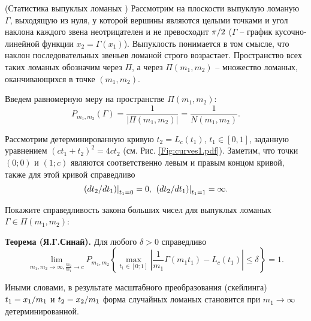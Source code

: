 \begin{problem}\DStar(Статистика выпуклых ломаных \cite{7})
\label{convcurve}
Рассмотрим на плоскости выпуклую ломаную $\Gamma $, выходящую из нуля, у которой вершины являются целыми точками и угол наклона каждого звена неотрицателен и не превосходит ${\pi \mathord{\left/ {\vphantom {\pi  2}} \right. \kern-\nulldelimiterspace} 2} $ ($\Gamma $ -- график кусочно-линейной функции $x_2 = \Gamma(x_1)$). Выпуклость понимается в том смысле, что наклон последовательных звеньев ломаной строго возрастает. Пространство всех таких ломаных обозначим через $\Pi $, а через $\Pi (m_{1} ,m_{2} )$ -- множество ломаных, оканчивающихся в точке $(m_{1} ,m_{2} )$. 

Введем равномерную меру на пространстве $\Pi (m_{1} ,m_{2} )$:
\[P_{m_{1} ,m_{2} } (\Gamma )=\frac{1}{\left|\Pi (m_{1} ,m_{2} )\right|} =\frac{1}{N(m_{1} ,m_{2} )} .\] 

Рассмотрим детерминированную кривую $t_2 = L_{c}(t_1) $, $t_1 \in [0,1]$, заданную уравнением $\left(ct_{1} +t_{2} \right)^{2} =4ct_{2} $ (см. Рис. \ref{Fig:curves1.pdf}). Заметим, что точки $(0;0)$ и $(1;c)$ являются соответственно левым и правым концом кривой, также для этой кривой справедливо \[\left. \left({dt_{2} \mathord{\left/ {\vphantom {dt_{2}  dt_{1} }} \right. \kern-\nulldelimiterspace} dt_{1} } \right)\right|_{t_{1} =0} =0, \; \left. \left({dt_{2} \mathord{\left/ {\vphantom {dt_{2}  dt_{1} }} \right. \kern-\nulldelimiterspace} dt_{1} } \right)\right|_{t_{1} =1} =\infty .\] 

Покажите справедливость закона больших чисел для выпуклых ломаных $\Gamma\in \Pi(m_{1} ,m_{2} )$:

\textbf{Теорема (Я.Г.Синай).} Для любого $\delta > 0$ справедливо
$$
\lim_{m_{1},m_2 \to \infty, \frac{m_2}{m_1}\to c} P_{m_{1} ,m_{2} } \left \{ \max_{t_1\in[0;1]}\left | \frac{1}{m_1}\Gamma(m_1 t_1) - L_c(t_1) \right |\le \delta \right\} = 1.
$$



Иными словами, в результате масштабного преобразования (скейлинга) $t_{1} ={x_{1} \mathord{\left/ {\vphantom {x_{1}  m_{1} }} \right. \kern-\nulldelimiterspace} m_{1} } $ и $t_{2} ={x_{2} \mathord{\left/ {\vphantom {x_{2}  m_{1} }} \right. \kern-\nulldelimiterspace} m_{1} } $ форма случайных ломаных становится при $m_{1} \to \infty $ детерминированной.

\end{problem}

